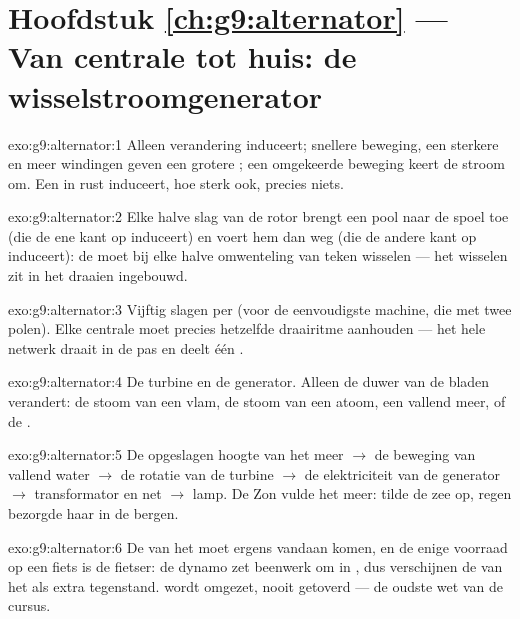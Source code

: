 \section*{Hoofdstuk \ref{ch:g9:alternator} --- Van centrale tot huis: de wisselstroomgenerator}

\begin{solution}{exo:g9:alternator:1}
Alleen verandering induceert; snellere beweging, een sterkere
 en meer windingen geven een grotere
; een omgekeerde beweging keert de stroom om. Een
 in rust induceert, hoe sterk ook, precies niets.
\end{solution}

\begin{solution}{exo:g9:alternator:2}
Elke halve slag van de rotor brengt een pool naar de spoel toe (die de
ene kant op induceert) en voert hem dan weg (die de andere kant op
induceert): de  moet bij elke halve omwenteling van
teken wisselen --- het wisselen zit in het draaien ingebouwd.
\end{solution}

\begin{solution}{exo:g9:alternator:3}
Vijftig slagen per  (voor de eenvoudigste machine, die met twee polen).
Elke centrale moet precies hetzelfde draairitme aanhouden --- het hele
netwerk draait in de pas en deelt één .
\end{solution}

\begin{solution}{exo:g9:alternator:4}
De turbine en de generator. Alleen de duwer van de bladen
verandert: de stoom van een vlam, de stoom van een atoom, een vallend
meer, of de .
\end{solution}

\begin{solution}{exo:g9:alternator:5}
De opgeslagen hoogte van het meer $\to$ de beweging van vallend water
$\to$ de rotatie van de turbine $\to$ de elektriciteit van de
generator $\to$ transformator en net $\to$ lamp. De Zon vulde het
meer:  tilde de zee op, regen bezorgde haar in de bergen.
\end{solution}

\begin{solution}{exo:g9:alternator:6}
De  van het  moet ergens vandaan komen, en de enige
voorraad op een fiets is de fietser: de dynamo zet beenwerk om in
, dus verschijnen de  van het  als
extra tegenstand.  wordt omgezet, nooit getoverd --- de
oudste wet van de cursus.
\end{solution}

